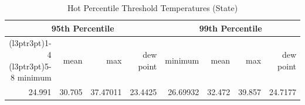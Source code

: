 \begin{table}
\centering
\caption{\label{tab:state_temp_threshold_hot}Hot Percentile Threshold Temperatures (State)}
\centering
\begin{tabular}[t]{rrrrrrrr}
\toprule
\multicolumn{4}{c}{95th Percentile} & \multicolumn{4}{c}{99th Percentile} \\
\cmidrule(l{3pt}r{3pt}){1-4} \cmidrule(l{3pt}r{3pt}){5-8}
minimum & mean & max & dew point & minimum & mean & max & dew point\\
\midrule
24.991 & 30.705 & 37.47011 & 23.4425 & 26.69932 & 32.472 & 39.857 & 24.7177\\
\bottomrule
\end{tabular}
\end{table}
